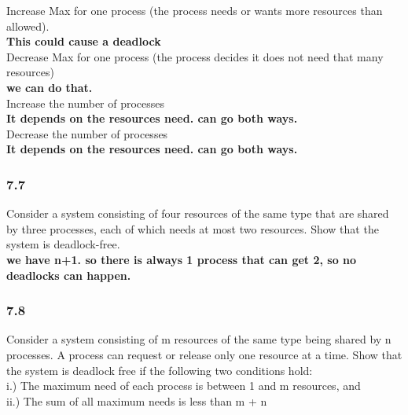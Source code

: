\documentclass[a4paper,10pt,titlepage]{report}
\begin{document}
Increase Max for one process (the process needs or wants more resources than allowed).\\
\textbf{This could cause a deadlock }\\

Decrease Max for one process (the process decides it does not need that many resources)\\
\textbf{we can do that.} \\

Increase the number of processes\\
\textbf{It depends on the resources need. can go both ways.}\\

Decrease the number of processes\\
\textbf{It depends on the resources need. can go both ways.}\\



\subsubsection{7.7} Consider a system consisting of four resources of the same type that are shared by three processes, each of which needs at most two resources. Show that the system is deadlock-free.\\

\textbf{we have n+1. so there is always 1 process that can get 2, so no deadlocks can happen.} \\

\subsubsection{7.8} Consider a system consisting of m resources of the same type being shared by n processes. A process can request or release only one resource at a time. Show that the system is deadlock free if the following two conditions hold:\\
i.) The maximum need of each process is between 1 and m resources, and \\
ii.) The sum of all maximum needs is less than m + n\\
\end{document}
